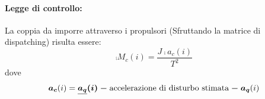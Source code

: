 \paragraph{Legge di controllo:}
La coppia da imporre attraverso i propulsori (Sfruttando la matrice di
dispatching) risulta essere:
\begin{equation}
	\comp{M_c}(i)=\dfrac{J \comp{a_c}(i)}{T^2}
\end{equation}
dove
\begin{equation}
	\boldsymbol{a_c}(i)=\boldsymbol{\underline{a_q}(i) - \mbox{accelerazione di disturbo stimata}
	-\boldsymbol{a_q}}(i)
\end{equation}

